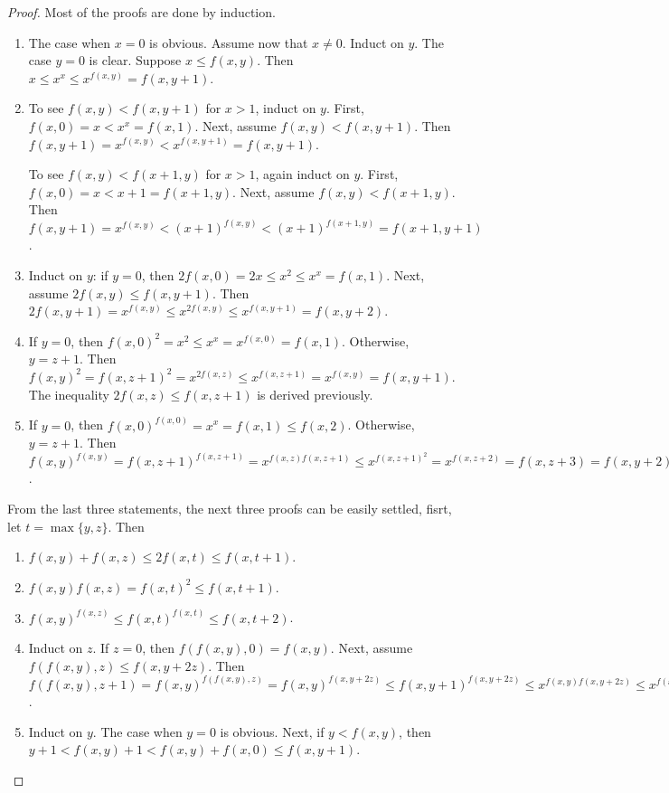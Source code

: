 \documentclass[12pt]{article}
\begin{document}
\begin{proof}  Most of the proofs are done by induction.
\begin{enumerate}
\item The case when $x=0$ is obvious.  Assume now that $x\ne 0$.  Induct on $y$.  The case $y=0$ is clear.  Suppose $x\le f(x,y)$.  Then $x\le x^x \le x^{f(x,y)}= f(x,y+1)$.
\item To see $f(x,y)< f(x,y+1)$ for $x>1$, induct on $y$.  First, $f(x,0)=x < x^x = f(x,1)$.  Next, assume $f(x,y)< f(x,y+1)$.  Then $f(x,y+1)=x^{f(x,y)} < x^{f(x,y+1)} = f(x,y+1)$.  

To see $f(x,y)< f(x+1,y)$ for $x>1$, again induct on $y$.  First, $f(x,0)=x < x+1=f(x+1,y)$.  Next, assume $f(x,y)< f(x+1,y)$.  Then $f(x,y+1)=x^{f(x,y)}<(x+1)^{f(x,y)} <(x+1)^{f(x+1,y)}=f(x+1,y+1)$.
\item Induct on $y$: if $y=0$, then $2f(x,0)=2x \le x^2 \le x^x = f(x,1)$.  Next, assume $2f(x,y)\le f(x,y+1)$.  Then $2f(x,y+1)=x^{f(x,y)}\le x^{2f(x,y)} \le x^{f(x,y+1)}=f(x,y+2)$.
\item If $y=0$, then $f(x,0)^2 = x^2 \le x^x = x^{f(x,0)}=f(x,1)$.  Otherwise, $y=z+1$.  Then $f(x,y)^2=f(x,z+1)^2 = x^{2f(x,z)} \le x^{f(x,z+1)} = x^{f(x,y)}=f(x,y+1)$.  The inequality $2f(x,z)\le f(x,z+1)$ is derived previously.
\item If $y=0$, then $f(x,0)^{f(x,0)}=x^x =f(x,1)\le f(x,2)$.  Otherwise, $y=z+1$.  Then $f(x,y)^{f(x,y)}=f(x,z+1)^{f(x,z+1)} = x^{f(x,z)f(x,z+1)} \le x^{f(x,z+1)^2}=x^{f(x,z+2)}=f(x,z+3)=f(x,y+2)$.
\end{enumerate}
From the last three statements, the next three proofs can be easily settled, fisrt, let $t=\max\lbrace y,z\rbrace$.  Then
\begin{enumerate}
\item[6.] $f(x,y)+f(x,z)\le 2f(x,t) \le f(x,t+1)$.
\item[7.] $f(x,y)f(x,z)=f(x,t)^2 \le f(x,t+1)$. 
\item[8.] $f(x,y)^{f(x,z)}\le f(x,t)^{f(x,t)} \le f(x,t+2)$. 
\item[9.] Induct on $z$.  If $z=0$, then $f(f(x,y),0)=f(x,y)$.  Next, assume $f(f(x,y),z)\le f(x,y+2z)$.  Then $f(f(x,y),z+1)= f(x,y)^{f(f(x,y),z)}= f(x,y)^{f(x,y+2z)} \le f(x,y+1)^{f(x,y+2z)} \le x^{f(x,y)f(x,y+2z)} \le x^{f(x,y+2z+1)}=f(x,y+2z+2)$.
\item[10.] Induct on $y$.  The case when $y=0$ is obvious.  Next, if $y< f(x,y)$, then $y+1 <f(x,y)+1<f(x,y)+f(x,0) \le f(x,y+1)$.
\end{enumerate}
\end{proof}
\end{document}
